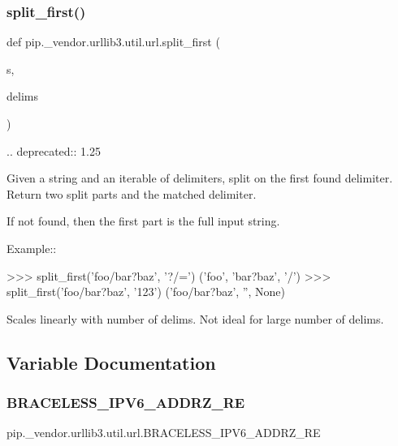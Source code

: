 \subsubsection{\texorpdfstring{split\+\_\+first()}{split\_first()}}
{\footnotesize\ttfamily def pip.\+\_\+vendor.\+urllib3.\+util.\+url.\+split\+\_\+first (\begin{DoxyParamCaption}\item[{}]{s,  }\item[{}]{delims }\end{DoxyParamCaption})}

\begin{DoxyVerb}.. deprecated:: 1.25

Given a string and an iterable of delimiters, split on the first found
delimiter. Return two split parts and the matched delimiter.

If not found, then the first part is the full input string.

Example::

    >>> split_first('foo/bar?baz', '?/=')
    ('foo', 'bar?baz', '/')
    >>> split_first('foo/bar?baz', '123')
    ('foo/bar?baz', '', None)

Scales linearly with number of delims. Not ideal for large number of delims.
\end{DoxyVerb}
 

\subsection{Variable Documentation}
\mbox{\label{namespacepip_1_1__vendor_1_1urllib3_1_1util_1_1url_a1b6455a0a4d02419657f4c64d3e43a8c}} 
\subsubsection{\texorpdfstring{B\+R\+A\+C\+E\+L\+E\+S\+S\+\_\+\+I\+P\+V6\+\_\+\+A\+D\+D\+R\+Z\+\_\+\+RE}{BRACELESS\_IPV6\_ADDRZ\_RE}}
{\footnotesize\ttfamily pip.\+\_\+vendor.\+urllib3.\+util.\+url.\+B\+R\+A\+C\+E\+L\+E\+S\+S\+\_\+\+I\+P\+V6\+\_\+\+A\+D\+D\+R\+Z\+\_\+\+RE}

